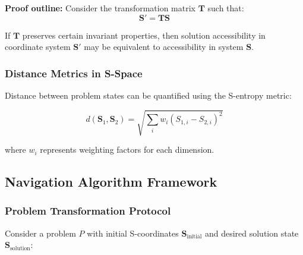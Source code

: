 \documentclass[11pt]{article}
\begin{document}
\textbf{Proof outline:} Consider the transformation matrix $\mathbf{T}$ such that:
\begin{equation}
\mathbf{S}' = \mathbf{T} \mathbf{S}
\label{eq:coordinate_transformation}
\end{equation}

If $\mathbf{T}$ preserves certain invariant properties, then solution accessibility in coordinate system $\mathbf{S}'$ may be equivalent to accessibility in system $\mathbf{S}$.

\subsubsection{Distance Metrics in S-Space}

Distance between problem states can be quantified using the S-entropy metric:

\begin{equation}
d(\mathbf{S}_1, \mathbf{S}_2) = \sqrt{\sum_{i} w_i (S_{1,i} - S_{2,i})^2}
\label{eq:s_entropy_distance}
\end{equation}

where $w_i$ represents weighting factors for each dimension.

\subsection{Navigation Algorithm Framework}

\subsubsection{Problem Transformation Protocol}

Consider a problem $P$ with initial S-coordinates $\mathbf{S}_{\text{initial}}$ and desired solution state $\mathbf{S}_{\text{solution}}$:
\end{document}
